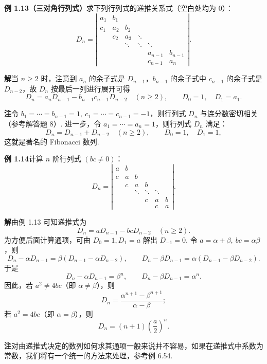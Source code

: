 \documentclass[UTF8,12pt,a4paper,fontset=fandol]{ctexart}
\begin{document}
\noindent\textbf{例 1.13（三对角行列式）}\quad 求下列行列式的递推关系式（空白处均为 $0$）：
\[
D_n=\left|\begin{array}{cccccc}
a_1 & b_1 &        &        &        & \\
c_1 & a_2 & b_2    &        &        & \\
    & c_2 & a_3    & \ddots &        & \\
    &     & \ddots & \ddots & \ddots & \\
    &     &        &        & a_{n-1} & b_{n-1}\\
    &     &        &        & c_{n-1} & a_n
\end{array}\right|.
\]

\noindent\textbf{解}\quad 当 $n\ge2$ 时，注意到 $a_n$ 的余子式是 $D_{n-1}$，$b_{n-1}$ 的余子式中 $c_{n-1}$ 的余子式是 $D_{n-2}$，故 $D_n$ 按最后一列进行展开可得
\[
D_n=a_nD_{n-1}-b_{n-1}c_{n-1}D_{n-2}\quad(n\ge2),\qquad
D_0=1,\quad D_1=a_1.
\]

\noindent\textbf{注}\quad 令 $b_1=\cdots=b_{n-1}=1,\ c_1=\cdots=c_{n-1}=-1$，则行列式 $D_n$ 与连分数密切相关（参考解答题 8）. 进一步，令 $a_1=\cdots=a_n=1$，则行列式 $D_n$ 满足：
\[
D_n=D_{n-1}+D_{n-2}\quad(n\ge2),\qquad D_0=1,\quad D_1=1,
\]
这就是著名的 Fibonacci 数列.

\noindent\textbf{例 1.14}\quad 计算 $n$ 阶行列式 $(bc\ne0)$：
\[
D_n=\left|\begin{array}{cccccc}
a & b &        &        &        & \\
c & a & b      &        &        & \\
  & c & a      & b      &        & \\
  &   & \ddots & \ddots & \ddots & \\
  &   &        & c      & a      & b\\
  &   &        &        & c      & a
\end{array}\right|.
\]

\noindent\textbf{解}\quad 由例 1.13 可知递推式为
\[
D_n=aD_{n-1}-bcD_{n-2}\quad(n\ge2).
\]
为方便后面计算通项，可由 $D_0=1,D_1=a$ 解出 $D_{-1}=0$. 令 $a=\alpha+\beta,\ bc=\alpha\beta$，则
\[
D_n-\alpha D_{n-1}=\beta(D_{n-1}-\alpha D_{n-2}),\qquad
D_n-\beta D_{n-1}=\alpha(D_{n-1}-\beta D_{n-2}).
\]
于是
\[
D_n-\alpha D_{n-1}=\beta^n,\qquad
D_n-\beta D_{n-1}=\alpha^n.
\]
因此，若 $a^2\ne4bc$（即 $\alpha\ne\beta$），则
\[
D_n=\frac{\alpha^{n+1}-\beta^{n+1}}{\alpha-\beta};
\]
若 $a^2=4bc$（即 $\alpha=\beta$），则
\[
D_n=(n+1)\left(\frac a2\right)^n.
\]

\noindent\textbf{注}\quad 对由递推式决定的数列如何求其通项一般来说并不容易，如果在递推式中系数为常数，我们将有一个统一的方法来处理，参考例 6.54.
\end{document}

